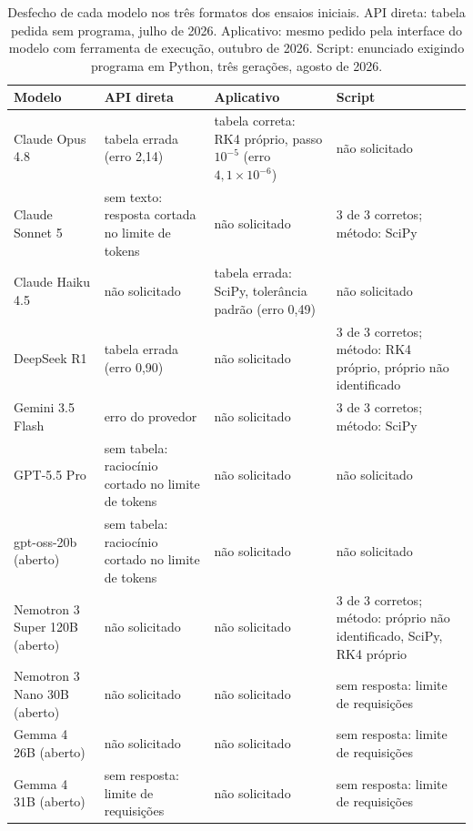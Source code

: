 \begin{table}[htbp]
  \caption{Desfecho de cada modelo nos três formatos dos ensaios iniciais. API direta: tabela pedida sem programa, julho de 2026. Aplicativo: mesmo pedido pela interface do modelo com ferramenta de execução, outubro de 2026. Script: enunciado exigindo programa em Python, três gerações, agosto de 2026.}
  \begin{tabular}{L{3.0cm}L{3.4cm}L{3.4cm}L{3.4cm}}
    \toprule
    \textbf{Modelo} & \textbf{API direta} & \textbf{Aplicativo} & \textbf{Script} \\
    \midrule
    Claude Opus 4.8 & tabela errada (erro 2,14) & tabela correta: RK4 próprio, passo $10^{-5}$ (erro $4{,}1\times10^{-6}$) & não solicitado \\
    Claude Sonnet 5 & sem texto: resposta cortada no limite de tokens & não solicitado & 3 de 3 corretos; método: SciPy \\
    Claude Haiku 4.5 & não solicitado & tabela errada: SciPy, tolerância padrão (erro 0,49) & não solicitado \\
    DeepSeek R1 & tabela errada (erro 0,90) & não solicitado & 3 de 3 corretos; método: RK4 próprio, próprio não identificado \\
    Gemini 3.5 Flash & erro do provedor & não solicitado & 3 de 3 corretos; método: SciPy \\
    GPT-5.5 Pro & sem tabela: raciocínio cortado no limite de tokens & não solicitado & não solicitado \\
    gpt-oss-20b (aberto) & sem tabela: raciocínio cortado no limite de tokens & não solicitado & não solicitado \\
    Nemotron 3 Super 120B (aberto) & não solicitado & não solicitado & 3 de 3 corretos; método: próprio não identificado, SciPy, RK4 próprio \\
    Nemotron 3 Nano 30B (aberto) & não solicitado & não solicitado & sem resposta: limite de requisições \\
    Gemma 4 26B (aberto) & não solicitado & não solicitado & sem resposta: limite de requisições \\
    Gemma 4 31B (aberto) & sem resposta: limite de requisições & não solicitado & sem resposta: limite de requisições \\
    \bottomrule
  \end{tabular}
  \label{tab:prelim-desfechos}
\end{table}
